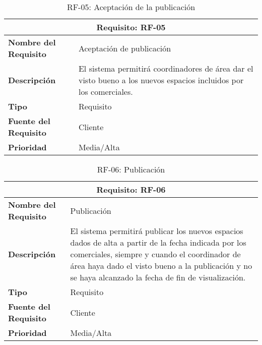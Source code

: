 \begin{table}[H]
\begin{center}
\begin{tabular}{p{} p{7cm}}
\multicolumn{2}{c}{\textbf{Requisito: RF-05} } \\
\hline \hline
\textbf{Nombre del Requisito} & Aceptación de publicación  \\
\hline
\textbf{Descripción} & El sistema permitirá coordinadores de área dar el visto bueno a los nuevos espacios incluidos por los comerciales. \\
\hline
\textbf{Tipo} & Requisito  \\
\hline
\textbf{Fuente del Requisito} & Cliente  \\
\hline
\textbf{Prioridad} &  Media/Alta \\ \hline
\end{tabular}
\caption{RF-05: Aceptación de la publicación}
\label{tab:RF-05}
\end{center}
\end{table}

\begin{table}[H]
\begin{center}
\begin{tabular}{p{} p{7cm}}
\multicolumn{2}{c}{\textbf{Requisito: RF-06} } \\
\hline \hline
\textbf{Nombre del Requisito} & Publicación  \\
\hline
\textbf{Descripción} & El sistema permitirá publicar los nuevos espacios dados de alta a partir de la fecha indicada por los comerciales, siempre y cuando el coordinador de área haya dado el visto bueno a la publicación y no se haya alcanzado la fecha de fin de visualización. \\
\hline
\textbf{Tipo} & Requisito  \\
\hline
\textbf{Fuente del Requisito} & Cliente  \\
\hline
\textbf{Prioridad} & Media/Alta  \\ \hline
\end{tabular}
\caption{RF-06: Publicación}
\label{tab:RF-06}
\end{center}
\end{table}

